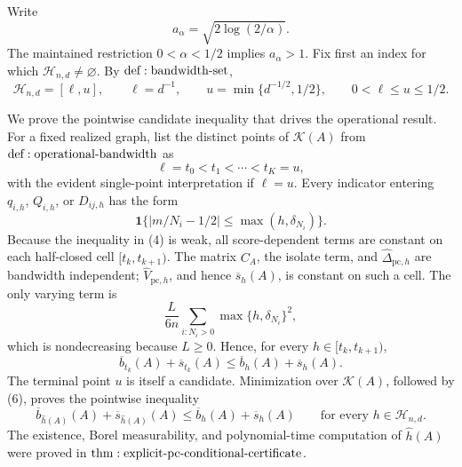 Write
\[
 a_\alpha=\sqrt{2\log(2/\alpha)}.
\tag{1}
\]
The maintained restriction \(0<\alpha<1/2\) implies \(a_\alpha>1\).  Fix first an index for which \(\mathcal H_{n,d}\ne\varnothing\).  By \({\rm def:bandwidth\text{-}set}\),
\[
 \mathcal H_{n,d}=[\ell,u],\qquad
 \ell=d^{-1},\qquad u=\min\{d^{-1/2},1/2\},
 \qquad 0<\ell\leq u\leq1/2.
\tag{2}
\]

We prove the pointwise candidate inequality that drives the operational result.  For a fixed realized graph, list the distinct points of \(\mathcal K(A)\) from \({\rm def:operational\text{-}bandwidth}\) as
\[
 \ell=t_0<t_1<\cdots<t_K=u,
\tag{3}
\]
with the evident single-point interpretation if \(\ell=u\).  Every indicator entering \(q_{i,h}\), \(Q_{i,h}\), or \(D_{ij,h}\) has the form
\[
 \mathbf1\{|m/N_i-1/2|\leq\max(h,\delta_{N_i})\}.
\tag{4}
\]
Because the inequality in (4) is weak, all score-dependent terms are constant on each half-closed cell \([t_k,t_{k+1})\).  The matrix \(C_A\), the isolate term, and \(\widehat\Delta_{\mathrm{pc},h}\) are bandwidth independent; \(\widehat V_{\mathrm{pc},h}\), and hence \(\overline s_h(A)\), is constant on such a cell.  The only varying term is
\[
 \frac{L}{6n}\sum_{i:N_i>0}\max\{h,\delta_{N_i}\}^2,
\tag{5}
\]
which is nondecreasing because \(L\geq0\).  Hence, for every \(h\in[t_k,t_{k+1})\),
\[
 \overline b_{t_k}(A)+\overline s_{t_k}(A)
 \leq\overline b_h(A)+\overline s_h(A).
\tag{6}
\]
The terminal point \(u\) is itself a candidate.  Minimization over \(\mathcal K(A)\), followed by (6), proves the pointwise inequality
\[
 \overline b_{\widehat h(A)}(A)+\overline s_{\widehat h(A)}(A)
 \leq\overline b_h(A)+\overline s_h(A)
 \qquad\text{for every }h\in\mathcal H_{n,d}.
\tag{7}
\]
The existence, Borel measurability, and polynomial-time computation of \(\widehat h(A)\) were proved in \({\rm thm:explicit\text{-}pc\text{-}conditional\text{-}certificate}\).

